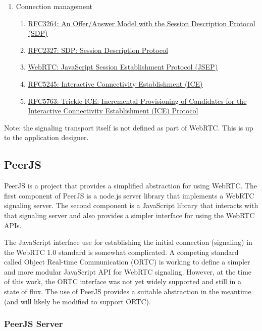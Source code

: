 \documentclass[9pt]{extarticle}
\begin{document}
\begin{multicols}{2}
\begin{enumerate}
\item Connection management
    \begin{enumerate}
    \item \href{https://tools.ietf.org/html/rfc3264}{RFC3264: An Offer/Answer Model with the Session Description Protocol (SDP)}
    \item \href{https://tools.ietf.org/html/rfc2327}{RFC2327: SDP: Session Description Protocol}
    \item \href{https://tools.ietf.org/html/draft-ietf-rtcweb-jsep-09}{WebRTC: JavaScript Session Establishment Protocol (JSEP)}
    \item \href{https://tools.ietf.org/html/rfc5245}{RFC5245: Interactive Connectivity Establishment (ICE)}
    \item \href{https://tools.ietf.org/html/draft-ietf-mmusic-trickle-ice-02}{RFC5763: Trickle ICE: Incremental Provisioning of Candidates for the Interactive Connectivity Establishment (ICE) Protocol}
    \end{enumerate}
\end{enumerate}

Note: the signaling transport itself is not defined as part of WebRTC.
This is up to the application designer.

\subsection{PeerJS}

PeerJS is a project that provides a simplified abstraction for using
WebRTC. The first component of PeerJS is a node.js server library that
implements a WebRTC signaling server. The second component is
a JavaScript library that interacts with that signaling server and
also provides a simpler interface for using the WebRTC APIs.

The JavaScript interface use for establishing the initial connection
(signaling) in the WebRTC 1.0 standard is somewhat complicated.
A competing standard called Object Real-time Communication (ORTC) is
working to define a simpler and more modular JavaScript API for WebRTC
signaling. However, at the time of this work, the ORTC interface was
not yet widely supported and still in a state of flux.  The use of
PeerJS provides a suitable abstraction in the meantime (and will
likely be modified to support ORTC).

\subsubsection{PeerJS Server}


\end{multicols}
\end{document}
